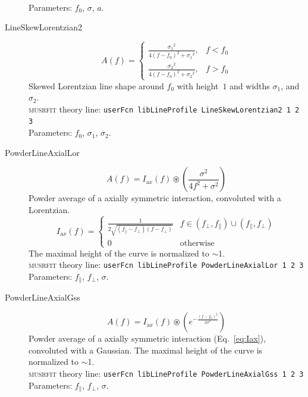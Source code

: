\documentclass[twoside]{article}
\newcommand{\musrfit}{\textsc{musrfit}\xspace}
\begin{document}
\begin{description}
\\[1.5ex]
    Parameters: $f_0$, $\sigma$, $a$. 
        \item[LineSkewLorentzian2]
   \begin{equation}
    A(f)=  \left\{\begin{matrix}\frac{{\sigma_1}^2}{4{(f-f_0)}^2+{\sigma_1}^2},&f<f_0\\[9pt] \frac{{\sigma_2}^2}{4{(f-f_0)}^2+{\sigma_2}^2},&f>f_0\end{matrix}\right.
   \end{equation}
   Skewed Lorentzian line shape around $f_0$ with height~$1$ and  widths $\sigma_1$, 
 and $\sigma_2$.\\[1.5ex]
   \musrfit theory line: \verb?userFcn libLineProfile LineSkewLorentzian2 1 2 3?
\\[1.5ex]
    Parameters: $f_0$, $\sigma_1$, $\sigma_2$. 
    
    
\item[PowderLineAxialLor]
   \begin{equation}
    A(f)= I_{\mathrm ax}(f)\circledast\left( \frac{\sigma^2}{4f^2+\sigma^2} \right)
   \end{equation}
   Powder average of a axially symmetric interaction, convoluted with a Lorentzian. 
   \begin{equation}\label{eq:Iax}
      I_{\mathrm ax}(f)=\left\{\begin{matrix} \frac{1}{2\sqrt{(f_\parallel-f_\perp)(f-f_\perp)}}& f\in(f_\perp,f_\parallel)\cup(f_\parallel,f_\perp)\\[6pt] 0 & \text{otherwise}\end{matrix} \right.
   \end{equation}
   The maximal height of the curve is normalized to $\sim$1.
   \\[1.5ex]
   \musrfit theory line: \verb?userFcn libLineProfile PowderLineAxialLor 1 2 3?
\\[1.5ex]
    Parameters: $f_\parallel$, $f_\perp$, $\sigma$. 
      
\item[PowderLineAxialGss]
   \begin{equation}
    A(f)= I_{\mathrm ax}(f)\circledast\left( e^{-\frac{(f-f_0)^2}{2 \sigma^2}} \right)
   \end{equation}
   Powder average of a axially symmetric interaction (Eq.~\ref{eq:Iax}), convoluted with a Gaussian. The maximal height of the curve is normalized to $\sim$1.
   \\[1.5ex]
   \musrfit theory line: \verb?userFcn libLineProfile PowderLineAxialGss 1 2 3?
\\[1.5ex]
    Parameters: $f_\parallel$, $f_\perp$, $\sigma$. 


\end{description}
\end{document}
